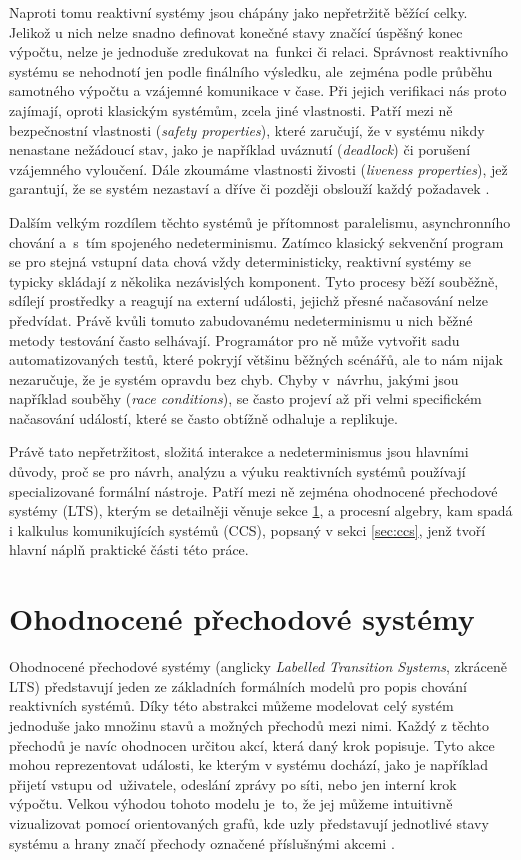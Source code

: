 Naproti tomu reaktivní systémy jsou chápány jako nepřetržitě běžící celky.
Jelikož u nich nelze snadno definovat konečné stavy značící úspěšný konec výpočtu, nelze je jednoduše zredukovat na~funkci či relaci.
Správnost reaktivního systému se nehodnotí jen podle finálního výsledku, ale~zejména podle průběhu samotného výpočtu a vzájemné komunikace v čase.
Při jejich verifikaci nás proto zajímají, oproti klasickým systémům, zcela jiné vlastnosti.
Patří mezi ně bezpečnostní vlastnosti (\textit{safety properties}), které zaručují, že v systému nikdy nenastane nežádoucí stav, 
jako je například uváznutí (\textit{deadlock}) či porušení vzájemného vyloučení.
Dále zkoumáme vlastnosti živosti (\textit{liveness properties}), jež garantují, že se systém nezastaví a dříve či později obslouží každý požadavek \cite{baier2008principles}.

Dalším velkým rozdílem těchto systémů je přítomnost paralelismu, asynchronního chování a~s~tím spojeného nedeterminismu.
Zatímco klasický sekvenční program se pro stejná vstupní data chová vždy deterministicky, reaktivní systémy se typicky skládají z několika nezávislých komponent.
Tyto procesy běží souběžně, sdílejí prostředky a reagují na externí události, jejichž přesné načasování nelze předvídat.
Právě kvůli tomuto zabudovanému nedeterminismu u nich běžné metody testování často selhávají.
Programátor pro ně může vytvořit sadu automatizovaných testů, které pokryjí většinu běžných scénářů, ale to nám nijak nezaručuje, že je systém opravdu bez chyb.
Chyby v~návrhu, jakými jsou například souběhy (\textit{race conditions}), se často projeví až při velmi specifickém načasování událostí, které se často obtížně odhaluje a replikuje.

Právě tato nepřetržitost, složitá interakce a nedeterminismus jsou hlavními důvody, proč se pro návrh, analýzu a výuku reaktivních systémů používají specializované formální nástroje.
Patří mezi ně zejména ohodnocené přechodové systémy (LTS), kterým se detailněji věnuje sekce \ref{sec:lts}, a procesní algebry, kam spadá i kalkulus komunikujících systémů (CCS), popsaný v sekci \ref{sec:ccs}, jenž tvoří hlavní náplň praktické části této práce.

\section{Ohodnocené přechodové systémy}
\label{sec:lts}
Ohodnocené přechodové systémy (anglicky \textit{Labelled Transition Systems}, zkráceně LTS) představují jeden ze základních formálních modelů pro popis chování reaktivních systémů. 
Díky této abstrakci můžeme modelovat celý systém jednoduše jako množinu stavů a možných přechodů mezi nimi. 
Každý z těchto přechodů je navíc ohodnocen určitou akcí, která daný krok popisuje. 
Tyto akce mohou reprezentovat události, ke kterým v systému dochází, jako je například přijetí vstupu od~uživatele, odeslání zprávy po síti, nebo jen interní krok výpočtu. 
Velkou výhodou tohoto modelu je~to, že jej můžeme intuitivně vizualizovat pomocí orientovaných grafů, kde uzly představují jednotlivé stavy systému a hrany značí přechody označené příslušnými akcemi \cite{aceto2007reactive}.

